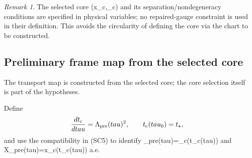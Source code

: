 \documentclass[11pt]{amsart}
\def\({}%
\def\){}%
\def\tau{tau}%
\theoremstyle{plain}
\theoremstyle{definition}
\theoremstyle{remark}
\newtheorem{remark}[theorem]{Remark}
\begin{document}
\begin{remark}
The selected core \((x_{\rm c},\rho_{\rm c})\) and its separation/nondegeneracy
conditions are specified in physical variables; no repaired-gauge constraint is used in
their definition.  This avoids the circularity of defining the core via the chart
to be constructed.
\end{remark}

\subsection{Preliminary frame map from the selected core}\label{paper2:sec:preliminary-frame}

The transport map is constructed from the selected core; the core selection
itself is part of the hypotheses.

Define
\[
\frac{dt_{\rm c}}{d\tau}=\Lambda_{\rm pre}(\tau)^2,\qquad t_{\rm c}(\tau_0)=t_\star,
\]
and use the compatibility in \textup{(SC5)} to identify
\(\Lambda_{\rm pre}(\tau)=\rho_{\rm c}(t_{\rm c}(\tau))\) and
\(X_{\rm pre}(\tau)=x_{\rm c}(t_{\rm c}(\tau))\) a.e.
\end{document}
